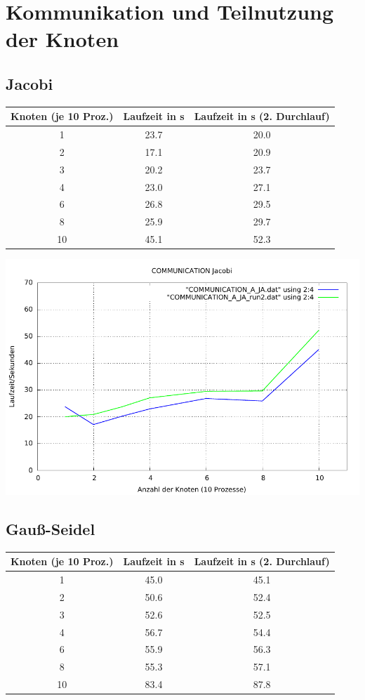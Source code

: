 \documentclass[a4paper]{article}
\begin{document}
\section{Kommunikation und Teilnutzung der Knoten}
\subsection{Jacobi}
\begin{tabular}{|c|c|c|}
\hline 
Knoten (je 10 Proz.) & Laufzeit in s & Laufzeit in s (2. Durchlauf) \\ 
\hline 
1 & 23.7 & 20.0 \\ 
\hline 
2 & 17.1 & 20.9 \\ 
\hline 
3 & 20.2 & 23.7 \\ 
\hline 
4 & 23.0 & 27.1 \\ 
\hline 
6 & 26.8 & 29.5 \\ 
\hline 
8 & 25.9 & 29.7 \\ 
\hline 
10 & 45.1 & 52.3 \\ 
\hline 
\end{tabular} 

\includegraphics[scale=0.8]{img/COMMUNICATION_JA_laufzeit.pdf}
\subsection{Gauß-Seidel}
\begin{tabular}{|c|c|c|}
\hline 
Knoten (je 10 Proz.) & Laufzeit in s & Laufzeit in s (2. Durchlauf) \\ 
\hline 
1 & 45.0 & 45.1 \\ 
\hline 
2 & 50.6 & 52.4 \\ 
\hline 
3 & 52.6 & 52.5 \\ 
\hline 
4 & 56.7 & 54.4 \\ 
\hline 
6 & 55.9 & 56.3 \\ 
\hline 
8 & 55.3 & 57.1 \\ 
\hline 
10 & 83.4 & 87.8 \\ 
\hline 
\end{tabular} 
\end{document}

